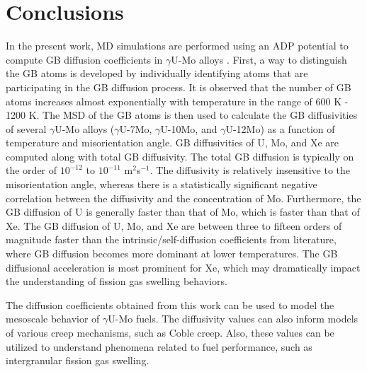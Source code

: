 \documentclass{elsarticle}
\begin{document}
\FloatBarrier
\section{Conclusions}

In the present work, MD simulations are performed using an ADP potential to compute GB diffusion coefficients in $\gamma$U-Mo alloys \cite{starikov2018}. First, a way to distinguish the GB atoms is developed by individually identifying atoms that are participating in the GB diffusion process. It is observed that the number of GB atoms increases almost exponentially with temperature in the range of 600 K - 1200 K. The MSD of the GB atoms is then used to calculate the GB diffusivities of several $\gamma$U-Mo alloys ($\gamma$U-7Mo, $\gamma$U-10Mo, and $\gamma$U-12Mo) as a function of temperature and misorientation angle. GB diffusivities of U, Mo, and Xe are computed along with total GB diffusivity. The total GB diffusion is typically on the order of $10^{-12}$ to $10^{-11}$ m$^2$s$^{-1}$. The diffusivity is relatively insensitive to the misorientation angle, whereas there is a statistically significant negative correlation between the diffusivity and the concentration of Mo. Furthermore, the GB diffusion of U is generally faster than that of Mo, which is faster than that of Xe. The GB diffusion of U, Mo, and Xe are between three to fifteen orders of magnitude faster than the intrinsic/self-diffusion coefficients from literature, where GB diffusion becomes more dominant at lower temperatures. The GB diffusional acceleration is most prominent for Xe, which may dramatically impact the understanding of fission gas swelling behaviors. 

The diffusion coefficients obtained from this work can be used to model the mesoscale behavior of $\gamma$U-Mo fuels. The diffusivity values can also inform models of various creep mechanisms, such as Coble creep. Also, these values can be utilized to understand phenomena related to fuel performance, such as intergranular fission gas swelling.
\end{document}
